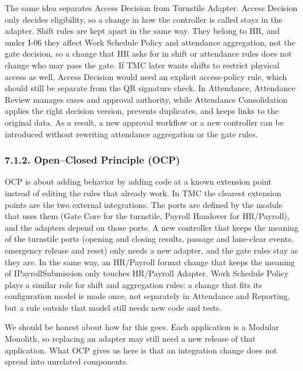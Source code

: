 The same idea separates Access Decision from Turnstile Adapter. Access Decision only decides eligibility, so a change in how the controller is called stays in the adapter. Shift rules are kept apart in the same way. They belong to HR, and under I-06 they affect Work Schedule Policy and attendance aggregation, not the gate decision, so a change that HR asks for in shift or attendance rules does not change who may pass the gate. If TMC later wants shifts to restrict physical access as well, Access Decision would need an explicit access-policy rule, which should still be separate from the QR signature check. In Attendance, Attendance Review manages cases and approval authority, while Attendance Consolidation applies the right decision version, prevents duplicates, and keeps links to the original data. As a result, a new approval workflow or a new controller can be introduced without rewriting attendance aggregation or the gate rules.

\subsubsection*{7.1.2. Open--Closed Principle (OCP)}

{}

OCP is about adding behavior by adding code at a known extension point instead of editing the rules that already work. In TMC the clearest extension points are the two external integrations. The ports are defined by the module that uses them (Gate Core for the turnstile, Payroll Handover for HR/Payroll), and the adapters depend on those ports. A new controller that keeps the meaning of the turnstile ports (opening and closing results, passage and lane-clear events, emergency release and reset) only needs a new adapter, and the gate rules stay as they are. In the same way, an HR/Payroll format change that keeps the meaning of IPayrollSubmission only touches HR/Payroll Adapter. Work Schedule Policy plays a similar role for shift and aggregation rules: a change that fits its configuration model is made once, not separately in Attendance and Reporting, but a rule outside that model still needs new code and tests.

We should be honest about how far this goes. Each application is a Modular Monolith, so replacing an adapter may still need a new release of that application. What OCP gives us here is that an integration change does not spread into unrelated components.

